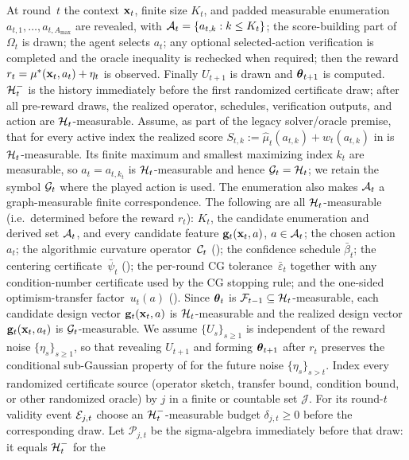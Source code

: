 At round~$t$ the context $\mathbf{x}_t$, finite size $K_t$, and padded measurable
enumeration $a_{t,1},\ldots,a_{t,A_{\max}}$ are revealed, with
$\mathcal{A}_t=\{a_{t,k}:k\le K_t\}$;
the score-building part of $\Omega_t$ is drawn; the agent selects $a_t$; any
optional selected-action verification is completed and the oracle inequality is
rechecked when required; then the reward
$r_t=\mu^*(\mathbf{x}_t,a_t)+\eta_t$ is observed.  Finally $U_{t+1}$ is drawn and
$\boldsymbol{\theta}_{t+1}$ is computed.  $\mathcal{H}_t^-$ is the history immediately before the
first randomized certificate draw; after all pre-reward draws, the realized
operator, schedules, verification outputs, and action are
$\mathcal{H}_t$-measurable.
Assume, as part of the legacy solver/oracle premise, that for every active
index the realized score
$S_{t,k}:=\widehat\mu_t(a_{t,k})+w_t(a_{t,k})$ in  is
$\mathcal{H}_t$-measurable.  Its finite maximum and smallest maximizing index $k_t$
are measurable, so $a_t=a_{t,k_t}$ is $\mathcal{H}_t$-measurable and hence
$\mathcal{G}_t=\mathcal{H}_t$; we retain the symbol $\mathcal{G}_t$ where the played action is used.
The enumeration also makes $\mathcal{A}_t$ a graph-measurable finite correspondence.
The following are all $\mathcal{H}_t$-measurable (i.e.\ determined before the reward
$r_t$): $K_t$, the candidate enumeration and derived set $\mathcal{A}_t$, and every candidate feature
$\mathbf{g}_t(\mathbf{x}_t,a)$, $a\in\mathcal{A}_t$; the chosen action $a_t$; the algorithmic
curvature operator~$\mathcal{C}_t$ (); the confidence schedule
$\bar\beta_t$; the centering certificate~$\bar\psi_t$
(); the per-round CG tolerance~$\bar\varepsilon_t$ together with
any condition-number certificate used by the CG stopping rule; and the one-sided
optimism-transfer factor~$u_t(a)$ ().
Since $\boldsymbol{\theta}_t$ is $\mathcal{F}_{t-1}\subseteq\mathcal{H}_t$-measurable, each candidate design
vector $\mathbf{g}_t(\mathbf{x}_t,a)$ is $\mathcal{H}_t$-measurable and the realized design vector
$\mathbf{g}_t(\mathbf{x}_t,a_t)$ is $\mathcal{G}_t$-measurable.
We assume $\{U_s\}_{s\ge1}$ is independent of the reward noise
$\{\eta_s\}_{s\ge1}$, so that revealing $U_{t+1}$ and forming $\boldsymbol{\theta}_{t+1}$
after $r_t$ preserves the conditional sub-Gaussian property of 
for the future noise $\{\eta_s\}_{s>t}$.
Index every randomized certificate source (operator sketch, transfer bound,
condition bound, or other randomized oracle) by $j$ in a finite or countable
set $\mathcal J$.  For its
round-$t$ validity event $\mathcal{E}_{j,t}$ choose an $\mathcal{H}_t^-$-measurable budget
$\delta_{j,t}\ge0$ before the corresponding draw.  Let $\mathcal P_{j,t}$ be
the sigma-algebra immediately before that draw: it equals $\mathcal{H}_t^-$ for the
